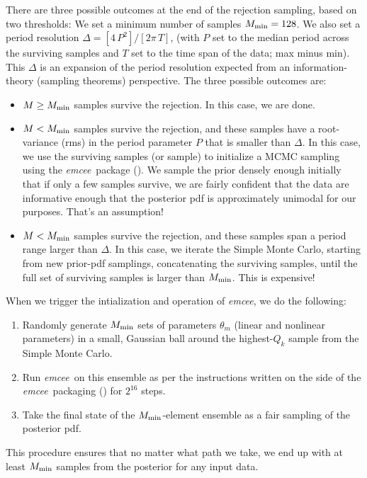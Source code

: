 \documentclass[12pt, preprint]{aastex6}
\newcommand{\project}[1]{\textsl{#1}}
\newcommand{\emcee}{\project{emcee}}
\begin{document}
There are three possible outcomes at the end of the rejection
sampling, based on two thresholds:
We set a minimum number of samples $M_{\rm min}=128$.
We also set a period resolution $\Delta = [4\,P^2] / [2\pi\,T]$, (with
$P$ set to the median period across the surviving samples and $T$ set to
the time span of the data; max minus min).
This $\Delta$ is an expansion of the period
resolution expected from an information-theory (sampling theorems) perspective.
The three possible outcomes are:
\begin{itemize}
\item $M\geq M_{\rm min}$ samples survive the rejection.
  In this case, we are done.
\item $M<M_{\rm min}$ samples survive the rejection, and these samples
  have a root-variance (rms) in the period parameter $P$ that is
  smaller than $\Delta$.
  In this case, we use the surviving samples (or sample) to
  initialize a MCMC sampling using the \emcee\ package (\citealt{emcee}).
  We sample the
  prior densely enough initially that if only a few samples survive,
  we are fairly confident that the data are informative enough that
  the posterior pdf is approximately unimodal for our purposes. That's
  an assumption!
\item $M<M_{\rm min}$ samples survive the rejection, and these samples
  span a period range larger than $\Delta$.
  In this case, we iterate the Simple
  Monte Carlo, starting from new prior-pdf samplings, concatenating
  the surviving samples, until the full set of surviving samples is
  larger than $M_{\rm min}$. This is expensive!
\end{itemize}
When we trigger the intialization and operation of \emcee, we do the following:
\begin{enumerate}
\item Randomly generate $M_{\rm min}$ sets of parameters $\theta_m$
  (linear and nonlinear parameters) in a small, Gaussian ball around
  the highest-$Q_k$ sample from the Simple Monte Carlo.
\item Run \emcee\ on this ensemble as per the instructions written on
  the side of the \emcee\ packaging (\citealt{emcee}) for $2^{16}$ steps.
\item Take the final state of the $M_{\rm min}$-element ensemble as a
  fair sampling of the posterior pdf.
\end{enumerate}
This procedure ensures that no matter what path we take, we end up with
at least $M_{\rm min}$ samples from the posterior for any input data.
\end{document}

